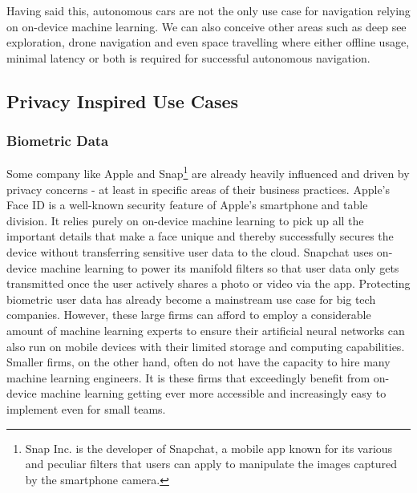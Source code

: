 \documentclass[
			   fontsize=11pt,
               paper=a4,
               bibliography=totoc,
               idxtotoc,
               headsepline,
               footsepline,
               footinclude=false,
               BCOR=12mm,
               DIV=13,
               openany,   %
               ]
               {scrbook}
\begin{document}
Having said this, autonomous cars are not the only use case for navigation relying on on-device machine learning. We can also conceive other areas such as deep see exploration, drone navigation and even space travelling where either offline usage, minimal latency or both is required for successful autonomous navigation.

\subsection{Privacy Inspired Use Cases}

\subsubsection{Biometric Data}
Some company like Apple and Snap\footnote{Snap Inc. is the developer of Snapchat, a mobile app known for its various and peculiar filters that users can apply to manipulate the images captured by the smartphone camera.} are already heavily influenced and driven by privacy concerns - at least in specific areas of their business practices. Apple's Face ID is a well-known security feature of Apple's smartphone and table division. It relies purely on on-device machine learning to pick up all the important details that make a face unique and thereby successfully secures the device without transferring sensitive user data to the cloud. Snapchat uses on-device machine learning to power its manifold filters so that user data only gets transmitted once the user actively shares a photo or video via the app. Protecting biometric user data has already become a mainstream use case for big tech companies. However, these large firms can afford to employ a considerable amount of machine learning experts to ensure their artificial neural networks can also run on mobile devices with their limited storage and computing capabilities. Smaller firms, on the other hand, often do not have the capacity to hire many machine learning engineers. It is these firms that exceedingly benefit from on-device machine learning getting ever more accessible and increasingly easy to implement even for small teams.
\end{document}
